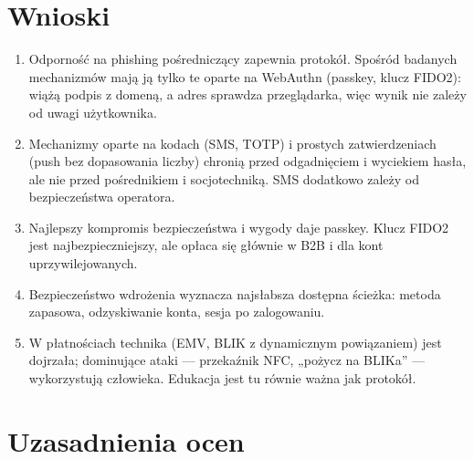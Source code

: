 \documentclass[11pt,a4paper]{article}
\begin{document}
\section{Wnioski}

\begin{enumerate}
  \item Odporność na phishing pośredniczący zapewnia protokół. Spośród badanych mechanizmów mają ją tylko te oparte na WebAuthn (passkey, klucz FIDO2): wiążą podpis z domeną, a adres sprawdza przeglądarka, więc wynik nie zależy od uwagi użytkownika.
  \item Mechanizmy oparte na kodach (SMS, TOTP) i prostych zatwierdzeniach (push bez dopasowania liczby) chronią przed odgadnięciem i wyciekiem hasła, ale nie przed pośrednikiem i socjotechniką. SMS dodatkowo zależy od bezpieczeństwa operatora.
  \item Najlepszy kompromis bezpieczeństwa i wygody daje passkey. Klucz FIDO2 jest najbezpieczniejszy, ale opłaca się głównie w B2B i dla kont uprzywilejowanych.
  \item Bezpieczeństwo wdrożenia wyznacza najsłabsza dostępna ścieżka: metoda zapasowa, odzyskiwanie konta, sesja po zalogowaniu.
  \item W płatnościach technika (EMV, BLIK z dynamicznym powiązaniem) jest dojrzała; dominujące ataki --- przekaźnik NFC, „pożycz na BLIKa” --- wykorzystują człowieka. Edukacja jest tu równie ważna jak protokół.
\end{enumerate}

\printbibliography[heading=bibintoc,title={Bibliografia}]

\appendix
\section{Uzasadnienia ocen}\label{app:uzasadnienia}

\end{document}
